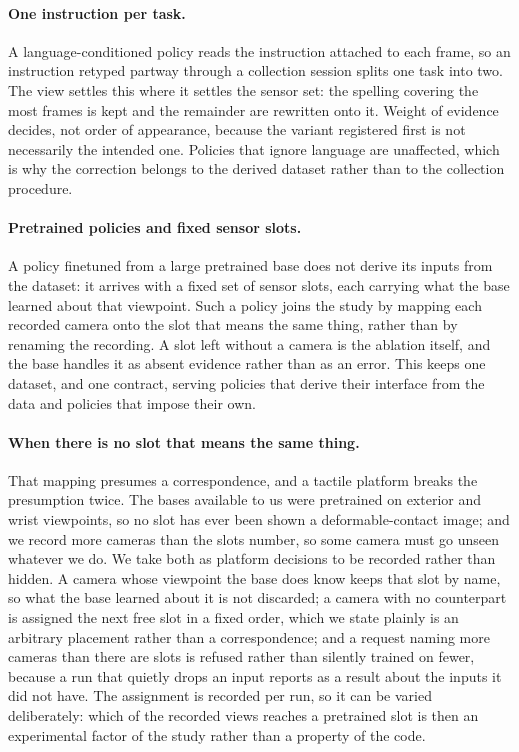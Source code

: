 \paragraph{One instruction per task.} A language-conditioned policy reads
the instruction attached to each frame, so an instruction retyped partway
through a collection session splits one task into two. The view settles
this where it settles the sensor set: the spelling covering the most frames
is kept and the remainder are rewritten onto it. Weight of evidence decides,
not order of appearance, because the variant registered first is not
necessarily the intended one. Policies that ignore language are unaffected,
which is why the correction belongs to the derived dataset rather than to
the collection procedure.

\paragraph{Pretrained policies and fixed sensor slots.} A policy finetuned
from a large pretrained base does not derive its inputs from the dataset:
it arrives with a fixed set of sensor slots, each carrying what the base
learned about that viewpoint. Such a policy joins the study by mapping each
recorded camera onto the slot that means the same thing, rather than by
renaming the recording. A slot left without a camera is the ablation
itself, and the base handles it as absent evidence rather than as an error.
This keeps one dataset, and one contract, serving policies that derive
their interface from the data and policies that impose their own.

\paragraph{When there is no slot that means the same thing.} That mapping
presumes a correspondence, and a tactile platform breaks the presumption
twice. The bases available to us were pretrained on exterior and wrist
viewpoints, so no slot has ever been shown a deformable-contact image; and we
record more cameras than the slots number, so some camera must go unseen
whatever we do. We take both as platform decisions to be recorded rather than
hidden. A camera whose viewpoint the base does know keeps that slot by name,
so what the base learned about it is not discarded; a camera with no
counterpart is assigned the next free slot in a fixed order, which we state
plainly is an arbitrary placement rather than a correspondence; and a request
naming more cameras than there are slots is refused rather than silently
trained on fewer, because a run that quietly drops an input reports as a
result about the inputs it did not have. The assignment is recorded per run,
so it can be varied deliberately: which of the recorded views reaches a
pretrained slot is then an experimental factor of the study rather than a
property of the code.

